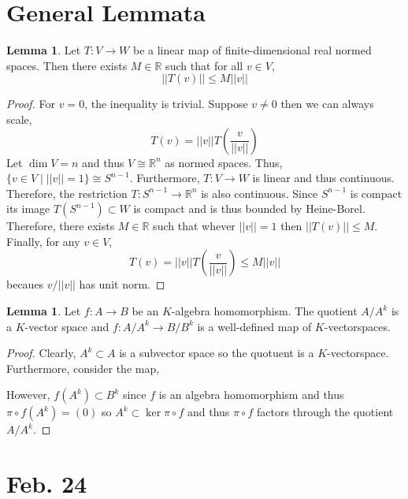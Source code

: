 \documentclass[12pt]{extarticle}
\newcommand{\R}{\mathbb{R}}
\theoremstyle{definition}
\newtheorem{lemma}[theorem]{Lemma}
\begin{document}
\section{General Lemmata}

\begin{lemma} \label{bounded_lin_op}
Let $T : V \to W$ be a linear map of finite-dimensional real normed spaces. Then there exists $M \in \R$ such that for all $v \in V$,
\[ ||T(v)|| \le M ||v|| \]
\end{lemma}

\begin{proof}
For $v = 0$, the inequality is trivial. Suppose $v \neq 0$ then we can always scale,
\[ T(v) = ||v|| T \left( \frac{v}{||v||} \right) \]
Let $\dim{V} = n$ and thus $V \cong \R^n$ as normed spaces. Thus, $\{ v \in V \mid ||v|| = 1\} \cong S^{n-1}$. Furthermore, $T : V \to W$ is linear and thus continuous. Therefore, the restriction $T : S^{n-1} \to \R^n$ is also continuous. Since $S^{n-1}$ is compact its image $T(S^{n-1}) \subset W$ is compact and is thus bounded by Heine-Borel. Therefore, there exists $M \in \R$ such that whever $||v|| = 1$ then $||T(v)|| \le M$. Finally, for any $v \in V$,
\[ T(v) = ||v|| T \left( \frac{v}{||v||} \right) \le M ||v|| \]
becaues $v / ||v||$ has unit norm. 
\end{proof}

\begin{lemma} \label{ring_map_quotient}
Let $f : A \to B$ be an $K$-algebra homomorphism. The quotient $A / A^k$ is a $K$-vector space and $f : A / A^k \to B / B^k$ is a well-defined map of $K$-vectorspaces. 
\end{lemma}

\begin{proof}
Clearly, $A^k \subset A$ is a subvector space so the quotuent is a $K$-vectorspace. Furthermore, consider the map,
\begin{center}
\end{center}
However, $f(A^k) \subset B^k$ since $f$ is an algebra homomorphism and thus $\pi \circ f(A^k) = (0)$ so $A^k \subset \ker{\pi \circ f}$ and thus $\pi \circ f$ factors through the quotient $A / A^k$.  
\end{proof}


\section{Feb. 24}
\end{document}

